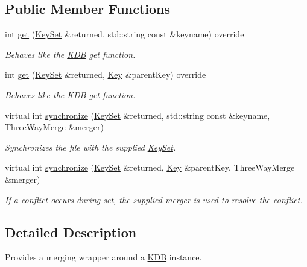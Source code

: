 \subsection*{Public Member Functions}
\begin{DoxyCompactItemize}
\item 
int \mbox{\hyperlink{classkdb_1_1tools_1_1merging_1_1MergingKDB_a0d2a28f24aeb6ba3e81af73ef8b98df7}{get}} (\mbox{\hyperlink{classkdb_1_1KeySet}{Key\+Set}} \&returned, std\+::string const \&keyname) override
\begin{DoxyCompactList}\small\item\em Behaves like the \mbox{\hyperlink{classkdb_1_1KDB}{K\+DB}} get function. \end{DoxyCompactList}\item 
int \mbox{\hyperlink{classkdb_1_1tools_1_1merging_1_1MergingKDB_a062b1dac733aa3999691f8d70635b09c}{get}} (\mbox{\hyperlink{classkdb_1_1KeySet}{Key\+Set}} \&returned, \mbox{\hyperlink{classkdb_1_1Key}{Key}} \&parent\+Key) override
\begin{DoxyCompactList}\small\item\em Behaves like the \mbox{\hyperlink{classkdb_1_1KDB}{K\+DB}} get function. \end{DoxyCompactList}\item 
virtual int \mbox{\hyperlink{classkdb_1_1tools_1_1merging_1_1MergingKDB_ae7fb5bd354d16ed90bbf0c4c087b5d6f}{synchronize}} (\mbox{\hyperlink{classkdb_1_1KeySet}{Key\+Set}} \&returned, std\+::string const \&keyname, Three\+Way\+Merge \&merger)
\begin{DoxyCompactList}\small\item\em Synchronizes the file with the supplied \mbox{\hyperlink{classkdb_1_1KeySet}{Key\+Set}}. \end{DoxyCompactList}\item 
virtual int \mbox{\hyperlink{classkdb_1_1tools_1_1merging_1_1MergingKDB_adcb436c4bf35c89c67ae2f5b3f1a9cfd}{synchronize}} (\mbox{\hyperlink{classkdb_1_1KeySet}{Key\+Set}} \&returned, \mbox{\hyperlink{classkdb_1_1Key}{Key}} \&parent\+Key, Three\+Way\+Merge \&merger)
\begin{DoxyCompactList}\small\item\em If a conflict occurs during set, the supplied merger is used to resolve the conflict. \end{DoxyCompactList}\end{DoxyCompactItemize}


\subsection{Detailed Description}
Provides a merging wrapper around a \mbox{\hyperlink{classkdb_1_1KDB}{K\+DB}} instance. 

